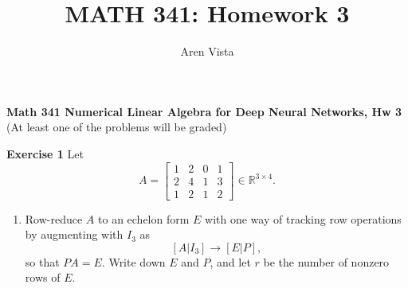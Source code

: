 \documentclass[9pt]{article}
\title{ MATH 341: Homework 3}
\author{ Aren Vista }
\theoremstyle{plain}
\begin{document}
\maketitle
\noindent \textbf{Math 341 Numerical Linear Algebra for Deep Neural Networks, Hw 3}  \\
(At least one of the problems will be graded)

\vspace{0.5cm}

\noindent \textbf{Exercise 1} Let
\[ A=\begin{bmatrix}1&2&0&1\\ 2&4&1&3\\ 1&2&1&2\end{bmatrix}\in\mathbb{R}^{3\times4}. \]

\begin{enumerate}
	\item[(a)] Row-reduce $A$ to an echelon form $E$ with one way of tracking row operations by augmenting with $I_{3}$ as
	      \[ [A|I_{3}]\longrightarrow[E|P], \]
	      so that $PA=E.$ Write down $E$ and $P$, and let $r$ be the number of nonzero rows of $E$.


\end{enumerate}
\end{document}
